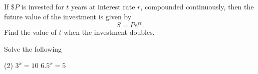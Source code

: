 \documentclass[../mathNotesPreamble]{subfiles}
\begin{document}
    \begin{ex*}
      If $\$P$ is invested for $t$ years at interest rate $r$, compounded continuously, then the future value of the investment is given by
        \[S=Pe^{rt}.\]
      Find the value of $t$ when the investment doubles.
    \end{ex*}
    \pagebreak

    \begin{center}
    \end{center}
    \begin{ex*}
      Solve the following
    \end{ex*}
    \begin{extasks}[after-item-skip=\stretch{1}](2)
      \task $3^x=10$
      \task $6.5^x=5$
    \end{extasks}
    \pagebreak
\end{document}
